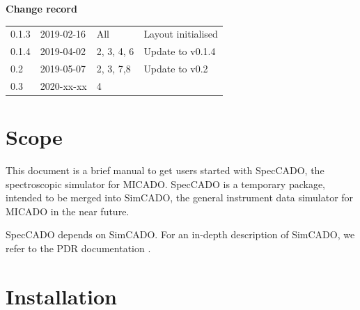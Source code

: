 \documentclass[a4paper,twoside,11pt]{article}
\begin{document}
\lstset{basicstyle=\ttfamily}
\dmdmaketitle


\begin{center}
  \textbf{Change record}

  \tabletail{\hline}

  \begin{supertabular}{|l|l|l|l|}
   0.1.3 & 2019-02-16 & All & Layout initialised \\
   0.1.4 & 2019-04-02 & 2, 3, 4, 6 & Update to v0.1.4 \\
   0.2   & 2019-05-07 & 2, 3, 7,8  & Update to v0.2 \\
   0.3   & 2020-xx-xx & 4          & \\
   \hline
  \end{supertabular}

\end{center}


\setcounter{tocdepth}{2}
\tableofcontents
\cleardoublepage


\section{Scope}
\label{sec:scope}

This document is a brief manual to get users started with SpecCADO,
the spectroscopic simulator for MICADO. SpecCADO is a temporary
package, intended to be merged into SimCADO, the general instrument
data simulator for MICADO in the near future.

SpecCADO depends on SimCADO. For an in-depth description of SimCADO,
we refer to the PDR documentation \cite{SimCADO-PDR}.

\section{Installation}
\label{sec:installation}
\end{document}
